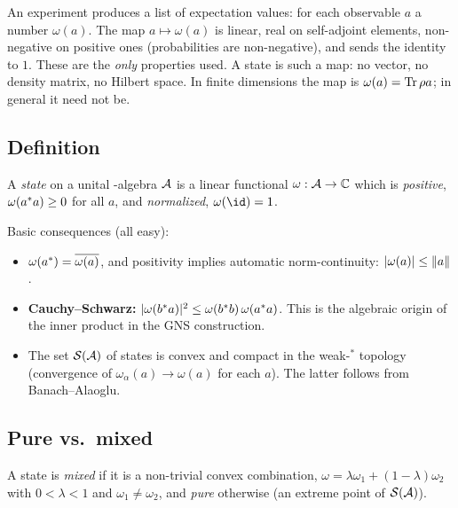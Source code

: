 \begin{physmotiv}
An experiment produces a list of expectation values: for each observable $a$ a number $\omega(a)$. The map $a\mapsto\omega(a)$ is linear, real on self-adjoint elements, non-negative on positive ones (probabilities are non-negative), and sends the identity to $1$. These are the \emph{only} properties used. A state is such a map: no vector, no density matrix, no Hilbert space. In finite dimensions the map is $\omega(a)=\operatorname{Tr}\rho a$; in general it need not be.
\end{physmotiv}

\subsection{Definition}

\begin{definition}
A \emph{state} on a unital \cstar-algebra $\mathcal{A}$ is a linear functional $\omega:\mathcal{A}\to\mathbb{C}$ which is \emph{positive}, $\omega(a^{*} a)\ge0$ for all $a$, and \emph{normalized}, $\omega(\id)=1$.
\end{definition}

Basic consequences (all easy):
\begin{itemize}
\item $\omega(a^{*})=\overline{\omega(a)}$, and positivity implies automatic norm-continuity: $|\omega(a)|\le\lVert a\rVert$.
\item \textbf{Cauchy--Schwarz:} $|\omega(b^{*} a)|^2\le\omega(b^{*} b)\,\omega(a^{*} a)$. This is the algebraic origin of the inner product in the GNS construction.
\item The set $\mathcal S(\mathcal{A})$ of states is convex and compact in the weak-$^*$ topology (convergence of $\omega_\alpha(a)\to\omega(a)$ for each $a$). The latter follows from Banach--Alaoglu.
\end{itemize}

\subsection{Pure vs.\ mixed}

A state is \emph{mixed} if it is a non-trivial convex combination, $\omega=\lambda\omega_1+(1-\lambda)\omega_2$ with $0<\lambda<1$ and $\omega_1\ne\omega_2$, and \emph{pure} otherwise (an extreme point of $\mathcal S(\mathcal{A})$).

